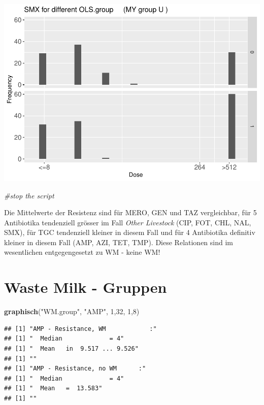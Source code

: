 \documentclass[
]{article}
\newenvironment{Shaded}{\begin{snugshade}}{\end{snugshade}}
\newcommand{\CommentTok}[1]{\textcolor[rgb]{0.56,0.35,0.01}{\textit{#1}}}
\newcommand{\DecValTok}[1]{\textcolor[rgb]{0.00,0.00,0.81}{#1}}
\newcommand{\KeywordTok}[1]{\textcolor[rgb]{0.13,0.29,0.53}{\textbf{#1}}}
\newcommand{\NormalTok}[1]{#1}
\newcommand{\StringTok}[1]{\textcolor[rgb]{0.31,0.60,0.02}{#1}}
\begin{document}
\includegraphics{Verteilungen_files/figure-latex/unnamed-chunk-30-1.pdf}

\begin{Shaded}
\begin{Highlighting}[]
  \CommentTok{#stop the script}
\end{Highlighting}
\end{Shaded}

Die Mittelwerte der Resistenz sind für MERO, GEN und TAZ vergleichbar,
für 5 Antibiotika tendenziell grösser im Fall \emph{Other Livestock}
(CIP, FOT, CHL, NAL, SMX), für TGC tendenziell kleiner in diesem Fall
und für 4 Antibiotika definitiv kleiner in diesem Fall (AMP, AZI, TET,
TMP). Diese Relationen sind im wesentlichen entgegengesetzt zu WM -
keine WM!

\hypertarget{waste-milk---gruppen}{%
\section{Waste Milk - Gruppen}\label{waste-milk---gruppen}}

\begin{Shaded}
\begin{Highlighting}[]
  \KeywordTok{graphisch}\NormalTok{(}\StringTok{"WM.group"}\NormalTok{, }\StringTok{"AMP"}\NormalTok{, }\DecValTok{1}\NormalTok{,}\DecValTok{32}\NormalTok{, }\DecValTok{1}\NormalTok{,}\DecValTok{8}\NormalTok{)}
\end{Highlighting}
\end{Shaded}

\begin{verbatim}
## [1] "AMP - Resistance, WM            :"
## [1] "  Median             = 4"
## [1] "  Mean   in  9.517 ... 9.526"
## [1] ""
## [1] "AMP - Resistance, no WM      :"
## [1] "  Median             = 4"
## [1] "  Mean   =  13.583"
## [1] ""
\end{verbatim}
\end{document}
